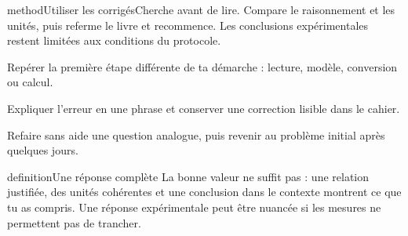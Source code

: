 \documentclass[11pt,twoside,openany]{book}
\begin{document}
\clearpage\pagestyle{otMain}




















\label{corriges-debut}
\begin{pcEncadre}{method}{Utiliser les corrigés}Cherche avant de lire. Compare le raisonnement et les unités, puis referme le livre et recommence. Les conclusions expérimentales restent limitées aux conditions du protocole.\end{pcEncadre}
\begin{questions}
\item Repérer la première étape différente de ta démarche : lecture, modèle, conversion ou calcul.
\item Expliquer l’erreur en une phrase et conserver une correction lisible dans le cahier.
\item Refaire sans aide une question analogue, puis revenir au problème initial après quelques jours.
\end{questions}
\begin{pcEncadre}{definition}{Une réponse complète}
La bonne valeur ne suffit pas : une relation justifiée, des unités cohérentes et une conclusion dans le contexte montrent ce que tu as compris. Une réponse expérimentale peut être nuancée si les mesures ne permettent pas de trancher.
\end{pcEncadre}





















\end{document}
